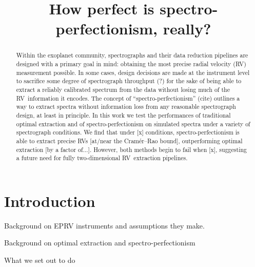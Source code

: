 \documentclass[modern]{aastex61}
\newcommand{\acronym}[1]{{\small{#1}}}
\newcommand{\RV}{\acronym{RV}}
\begin{document}
\sloppy\sloppypar\raggedbottom\frenchspacing %
\graphicspath{ {figures/} }

\title{How perfect is spectro-perfectionism, really?}

\begin{abstract}\noindent
Within the exoplanet community, spectrographs and their data reduction pipelines are designed with a primary goal in mind: obtaining the most precise radial velocity (\RV) measurement possible. 
In some cases, design decisions are made at the instrument level to sacrifice some degree of spectrograph throughput (?) for the sake of being able to extract a reliably calibrated spectrum from the data without losing much of the \RV\ information it encodes. 
The concept of ``spectro-perfectionism'' (cite) outlines a way to extract spectra without information loss from any reasonable spectrograph design, at least in principle. 
In this work we test the performances of traditional optimal extraction and of spectro-perfectionism on simulated spectra under a variety of spectrograph conditions. 
We find that under [x] conditions, spectro-perfectionism is able to extract precise \RV s [at/near the Cram\'er--Rao bound], outperforming optimal extraction [by a factor of...]. 
However, both methods begin to fail when [x], suggesting a future need for fully two-dimensional \RV\ extraction pipelines.
\end{abstract}

\section{Introduction}

Background on EPRV instruments and assumptions they make.

Background on optimal extraction and spectro-perfectionism

What we set out to do
\end{document}
